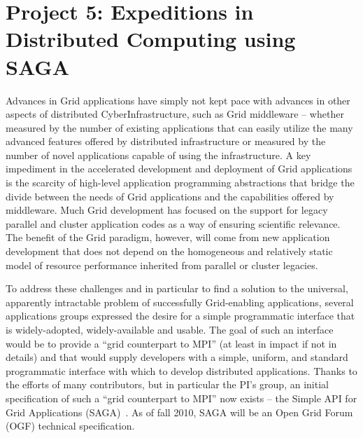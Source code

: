\documentclass[a4paper,10pt]{article}
\newcommand{\up}{\vspace*{-1em}}
\begin{document}
\up\up
\section*{Project 5: Expeditions in Distributed Computing using SAGA}
\up

Advances in Grid applications have simply not kept pace with advances in other aspects of 
distributed CyberInfrastructure, such as Grid middleware -- whether measured by the number of 
existing applications that can easily utilize the many advanced features offered by distributed 
infrastructure or measured by the number of novel applications capable of using the 
infrastructure. A key impediment in the accelerated development and deployment of Grid 
applications is the scarcity of high-level application programming abstractions that bridge the 
divide between the needs of Grid applications and the capabilities offered by middleware.  Much 
Grid development has focused on the support for legacy parallel and cluster application codes 
as a way of ensuring scientific relevance.  The benefit of the Grid paradigm, however, will 
come from new application development that does not depend on the homogeneous and relatively 
static model of resource performance inherited from parallel or cluster legacies.  %

To address these challenges and in particular to find a solution to the universal, apparently 
intractable problem of successfully Grid-enabling applications, several applications groups 
expressed the desire for a simple programmatic interface that is widely-adopted, widely-available 
and usable. The goal of such an interface would be to provide a ``grid counterpart to MPI'' (at 
least in impact if not in details) and that would supply developers with a simple, uniform, and 
standard programmatic interface with which to develop distributed applications.  Thanks to the 
efforts of many contributors, but in particular the PI's group, an initial specification of 
such a ``grid counterpart to MPI'' now exists -- the Simple API for Grid Applications 
(SAGA)~\cite{saga_url}. As of fall 2010, SAGA will be an Open Grid Forum (OGF) technical 
specification.
\end{document}
